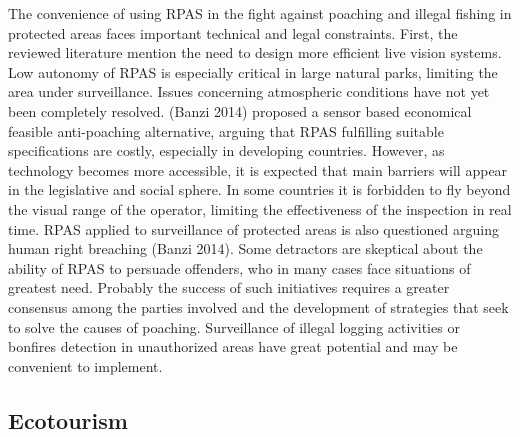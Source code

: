 \documentclass[]{interact}
\theoremstyle{plain}%
\theoremstyle{definition}
\theoremstyle{remark}
\begin{document}
The convenience of using RPAS in the fight against poaching and illegal
fishing in protected areas faces important technical and legal
constraints. First, the reviewed literature mention the need to design
more efficient live vision systems. Low autonomy of RPAS is especially
critical in large natural parks, limiting the area under surveillance.
Issues concerning atmospheric conditions have not yet been completely
resolved. (Banzi 2014) proposed a sensor based economical feasible
anti-poaching alternative, arguing that RPAS fulfilling suitable
specifications are costly, especially in developing countries. However,
as technology becomes more accessible, it is expected that main barriers
will appear in the legislative and social sphere. In some countries it
is forbidden to fly beyond the visual range of the operator, limiting
the effectiveness of the inspection in real time. RPAS applied to
surveillance of protected areas is also questioned arguing human right
breaching (Banzi 2014). Some detractors are skeptical about the ability
of RPAS to persuade offenders, who in many cases face situations of
greatest need. Probably the success of such initiatives requires a
greater consensus among the parties involved and the development of
strategies that seek to solve the causes of poaching. Surveillance of
illegal logging activities or bonfires detection in unauthorized areas
have great potential and may be convenient to implement.

\subsection{Ecotourism}\label{ecotourism-1}
\end{document}
